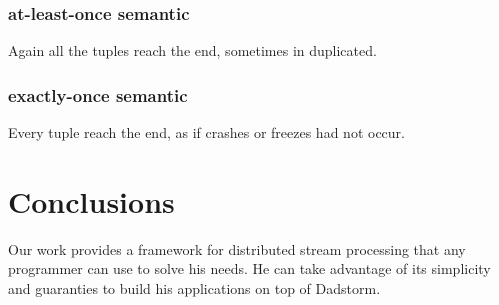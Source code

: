 \documentclass[times, 10pt,twocolumn]{article}
\begin{document}
\subsubsection{at-least-once semantic}
Again all the tuples reach the end, sometimes in duplicated.

\subsubsection{exactly-once semantic}
Every tuple reach the end, as if crashes or freezes had not occur.


\section{Conclusions}


Our work provides a framework for distributed stream processing that any programmer can use to solve his
needs. He can take advantage of its simplicity and guaranties to build his applications on top of Dadstorm.
\end{document}
